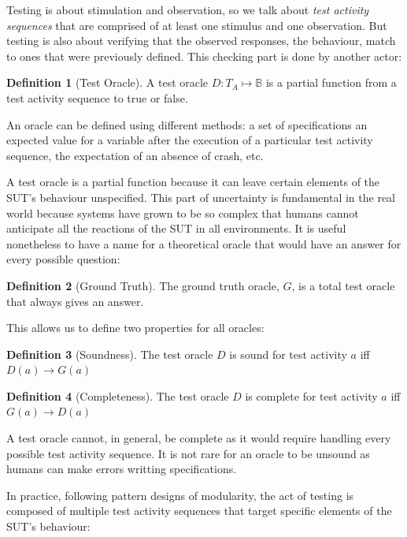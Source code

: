\documentclass[a4paper,11pt]{sdm_internship}
\theoremstyle{definition}
\newtheorem{definition}{Definition}[section]
\begin{document}
Testing is about stimulation and observation, so we talk about \emph{test activity sequences} that are comprised of at least one stimulus and one observation.
But testing is also about verifying that the observed responses, the behaviour, match to ones that were previously defined.
This checking part is done by another actor:

\begin{definition}[Test Oracle]
  A test oracle $D : T_A \mapsto \mathbb{B}$ is a partial function from a test activity sequence to true or false.
\end{definition}

An oracle can be defined using different methods: a set of specifications an expected value for a variable after the execution of a particular test activity sequence, the expectation of an absence of crash, etc.

A test oracle is a partial function because it can leave certain elements of the SUT's behaviour unspecified.
This part of uncertainty is fundamental in the real world because systems have grown to be so complex that humans cannot anticipate all the reactions of the SUT in all environments.
It is useful nonetheless to have a name for a theoretical oracle that would have an answer for every possible question:

\begin{definition}[Ground Truth]
  The ground truth oracle, $G$, is a total test oracle that always gives an answer.
\end{definition}

This allows us to define two properties for all oracles:

\begin{definition}[Soundness]
  The test oracle $D$ is sound for test activity $a$ iff $D(a) \rightarrow G(a)$
\end{definition}
\begin{definition}[Completeness]
  The test oracle $D$ is complete for test activity $a$ iff $G(a) \rightarrow D(a)$
\end{definition}

A test oracle cannot, in general, be complete as it would require handling every possible test activity sequence.
It is not rare for an oracle to be unsound as humans can make errors writting specifications.

In practice, following pattern designs of modularity, the act of testing is composed of multiple test activity sequences that target specific elements of the SUT's behaviour:
\end{document}
